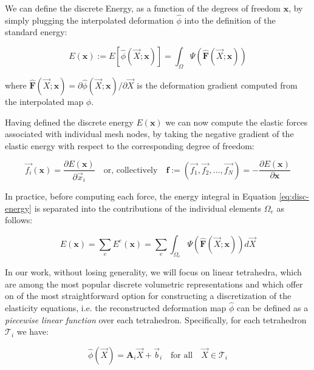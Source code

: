 \documentclass{article} %
\begin{document}
We can define the discrete Energy, as a function of the degrees of freedom $\mathbf{x}$, by simply plugging the interpolated deformation $\hat{\phi}$ into the definition of the standard energy:

\begin{equation}
E(\mathbf{x} ) := E \left[  \hat{\phi}(\overrightarrow{X}; \mathbf{x}) \right] = \int_{\Omega} \Psi \left( \hat{\mathbf{F}}(\overrightarrow{X}; \mathbf{x}) \right)
\label{eq:disc-energy}
\end{equation}

where $\hat{\mathbf{F}}(\overrightarrow{X}; \mathbf{x}) = \partial\hat{\phi}(\overrightarrow{X}; \mathbf{x}) / \partial\overrightarrow{X}$ is the deformation gradient computed from the interpolated map $\hat{\phi}$.

Having defined the discrete energy $E(\mathbf{x})$ we can now compute the elastic forces associated with individual mesh nodes, by taking the negative gradient of the elastic energy with respect to the corresponding degree of freedom: 

$$ \overrightarrow{f_i}(\mathbf{x}) = \frac{\partial E(\mathbf{x})}{\partial\overrightarrow{x}_i}\quad \text{or, collectively}\quad \mathbf{f} := (\overrightarrow{f_1}, \overrightarrow{f_2}, \dots, \overrightarrow{f_N}) = - \frac{\partial E(\mathbf{x})}{\partial \mathbf{x}}$$

In practice, before computing each force, the energy integral in Equation \ref{eq:disc-energy}  is separated into the contributions of the individual elements $\Omega_e$ as follows: 

\begin{equation}
E(\mathbf{x}) = \sum_e E^e (\mathbf{x}) = \sum_e \int_{\Omega_e} \Psi ( \hat{ \mathbf{F} }( \overrightarrow{X}; \mathbf{x} )  ) d\overrightarrow{X}
\label{eq:tetra-energy}
\end{equation} 

In our work, without losing generality, we will focus on linear tetrahedra, which are among the most popular discrete volumetric representations and which offer on of the most straightforward option for constructing a discretization of the elasticity equations, i.e. the reconstructed deformation map $\hat{\phi}$ can be defined as a \emph{piecewise linear function} over each tetrahedron. Specifically, for each tetrahedron $\mathcal{T}_i$ we have:

\begin{equation}
\hat{\phi} ( \overrightarrow{X} )= \mathbf{A}_i\overrightarrow{X} + \overrightarrow{b}_ i\quad \text{for all}\quad \overrightarrow{X} \in \mathcal{T}_i
\label{eq:tetra-interpol}
\end{equation}  
\end{document}
